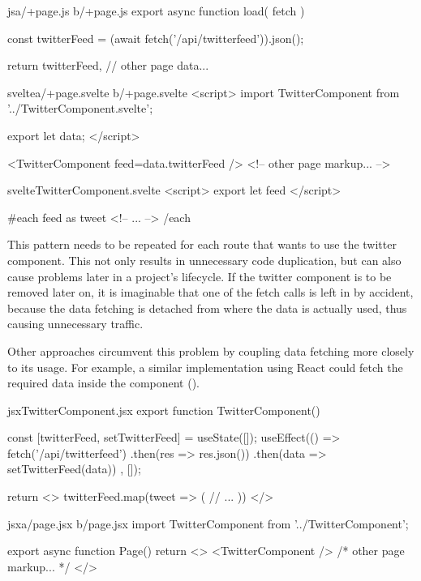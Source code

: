 \begin{listing}[h!]
\begin{myminted}{js}{a/+page.js b/+page.js}
export async function load({ fetch }) {

    const twitterFeed = (await fetch('/api/twitterfeed')).json();

    return {
        twitterFeed,
        // other page data...
    }
}

\end{myminted}
\begin{myminted}{svelte}{a/+page.svelte b/+page.svelte}
<script>
    import TwitterComponent from '../TwitterComponent.svelte';

    export let data;
</script>

<TwitterComponent feed={data.twitterFeed} />
<!-- other page markup... -->
\end{myminted}
\begin{myminted}{svelte}{TwitterComponent.svelte}
<script>
    export let feed
</script>

{#each feed as tweet}
    <!-- ... -->
{/each}
\end{myminted}
\caption{Example Implementation of a reusable component in SvelteKit}
\label{fig:evaluation-reusable-sveltekit}
\end{listing}

This pattern needs to be repeated for each route that wants to use the twitter component. This not only results in unnecessary code duplication, but can also cause problems later in a project's lifecycle. If the twitter component is to be removed later on, it is imaginable that one of the fetch calls is left in by accident, because the data fetching is detached from where the data is actually used, thus causing unnecessary traffic.

Other approaches circumvent this problem by coupling data fetching more closely to its usage. For example, a similar implementation using React could fetch the required data inside the component ().

\begin{listing}[H]
\begin{myminted}{jsx}{TwitterComponent.jsx}
export function TwitterComponent() {
    const [twitterFeed, setTwitterFeed] = useState([]);
    useEffect(() => {
      fetch('/api/twitterfeed')
        .then(res => res.json())
        .then(data => setTwitterFeed(data))
    }, []);

    return <>
        {twitterFeed.map(tweet => (
            // ...
        ))}
    </>
}
\end{myminted}
\begin{myminted}{jsx}{a/page.jsx b/page.jsx}
import TwitterComponent from '../TwitterComponent';

export async function Page() {
    return <>
        <TwitterComponent />
        { /* other page markup... */ }
    </>
}
\end{myminted}
\caption{Example of a reusable component using React server components.}
\label{fig:evaluation-reusable-rsc}
\end{listing}

